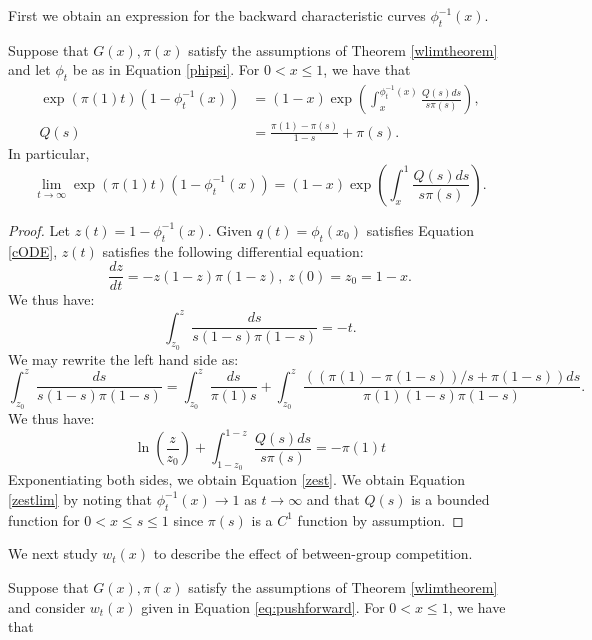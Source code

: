 \documentclass[11pt]{article}
\numberwithin{equation}{section}
\newcommand{\paren}[1]{\left(#1\right)}
\newcommand{\D}[2]{\frac{d#1}{d#2}}
\begin{document}
{First we obtain an expression for the backward characteristic curves $\phi_t^{-1}(x)$.
\begin{lemma} \label{lem:epi1tformula}
Suppose that $G(x), \pi(x)$ satisfy the assumptions of Theorem \ref{wlimtheorem} and let $\phi_t$ be as in Equation \eqref{phipsi}. For $0<x\leq 1$, we have that
\begin{equation}\label{zest}
\begin{split}
\exp(\pi(1)t)(1-\phi_t^{-1}(x))&=(1-x)\exp\paren{\int_x^{\phi_t^{-1}(x)} \frac{Q(s)ds}{s\pi(s)}},\\
Q(s)&=\frac{\pi(1)-\pi(s)}{1-s}+\pi(s).
\end{split}
\end{equation}
In particular, 
\begin{equation}\label{zestlim}
\lim_{t\to \infty}\exp(\pi(1)t)(1-\phi_t^{-1}(x))=(1-x)\exp\paren{\int_x^1 \frac{Q(s)ds}{s\pi(s)}}.
\end{equation}
\end{lemma}
\begin{proof}
Let $z(t)=1-\phi_t^{-1}(x)$. Given $q(t)=\phi_t(x_0)$ satisfies Equation \eqref{cODE},  
$z(t)$ satisfies the following differential equation:
\begin{equation}
\D{z}{t}=-z(1-z)\pi(1-z), \; z(0)=z_0=1-x.
\end{equation}
We thus have:
\begin{equation}
\int_{z_0}^z \frac{ds}{s(1-s)\pi(1-s)}= -t.
\end{equation}
We may rewrite the left hand side as:
\begin{equation}
\int_{z_0}^z \frac{ds}{s(1-s)\pi(1-s)}=\int_{z_0}^z \frac{ds}{\pi(1)s}
+\int_{z_0}^z \frac{((\pi(1)-\pi(1-s))/s +\pi(1-s))ds}{\pi(1)(1-s)\pi(1-s)}.
\end{equation}
We thus have:
\begin{equation}
\ln\paren{\frac{z}{z_0}}+\int_{1-z_0}^{1-z} \frac{Q(s)ds}{s\pi(s)}=-\pi(1)t
\end{equation}
Exponentiating both sides, we obtain Equation \eqref{zest}. We obtain Equation \eqref{zestlim} by noting that $\phi_t^{-1}(x)\to 1$ as $t\to \infty$ 
and that $Q(s)$ is a bounded function for $0<x\leq s\leq 1$ since $\pi(s)$ is a $C^1$ function by assumption. 
\end{proof}
We next study $w_t(x)$ to describe the effect of between-group competition. 
\begin{lemma} \label{lem:wtformula}
Suppose that $G(x), \pi(x)$ satisfy the assumptions of Theorem \ref{wlimtheorem} and consider $w_t(x)$ given in Equation \eqref{eq:pushforward}. For $0<x\leq 1$, we have that

\end{lemma}}
\end{document}
